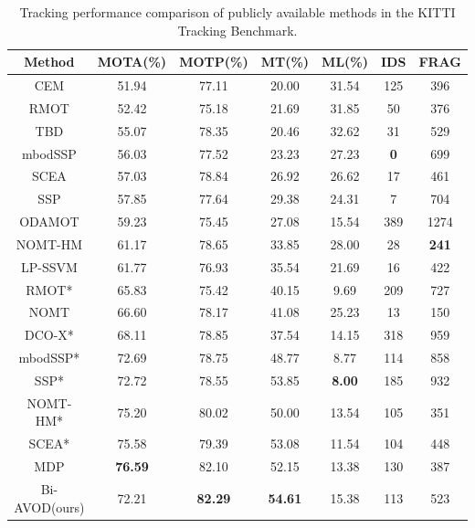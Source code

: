 \documentclass[letterpaper, 10 pt, conference]{ieeeconf}  %
\begin{document}
\begin{table}\centering
	\begin{tabular}{ccccccc}
		\toprule[1.5pt]
		Method        & MOTA(\%) & MOTP(\%) & MT(\%) & ML(\%) & IDS & FRAG \\ \midrule
		CEM\cite{Milan2014PAMI}           & 51.94    & 77.11    & 20.00  & 31.54  & 125 & 396  \\
		RMOT\cite{Yoon2015WACV}          & 52.42    & 75.18    & 21.69  & 31.85  & 50  & 376  \\
		TBD\cite{Geiger2014PAMI}           & 55.07    & 78.35    & 20.46  & 32.62  & 31  & 529  \\
		mbodSSP\cite{Lenz2015ICCV}        & 56.03    & 77.52    & 23.23  & 27.23  & \textbf{0}   & 699  \\
		SCEA\cite{Yoon2016CVPR}          & 57.03    & 78.84    & 26.92  & 26.62  & 17  & 461  \\
		SSP\cite{Lenz2015ICCV}            & 57.85    & 77.64    & 29.38  & 24.31  & 7   & 704  \\
		ODAMOT\cite{Gaidon2015BMVC}        & 59.23    & 75.45    & 27.08  & 15.54  & 389 & 1274 \\
		NOMT-HM\cite{Choi2015ICCV}       & 61.17    & 78.65    & 33.85  & 28.00  & 28  & \textbf{241}  \\
		LP-SSVM\cite{Wang2016IJCV}       & 61.77    & 76.93    & 35.54  & 21.69  & 16  & 422  \\
		RMOT*\cite{Yoon2015WACV}         & 65.83    & 75.42    & 40.15  & 9.69   & 209 & 727  \\
		NOMT\cite{Choi2015ICCV}          & 66.60    & 78.17    & 41.08  & 25.23  & 13  & 150  \\
		DCO-X*\cite{Milan2013CVPR}        & 68.11    & 78.85    & 37.54  & 14.15  & 318 & 959  \\
		mbodSSP*\cite{Lenz2015ICCV}       & 72.69    & 78.75    & 48.77  & 8.77   & 114 & 858  \\
		SSP*\cite{Lenz2015ICCV}           & 72.72    & 78.55    & 53.85  & \textbf{8.00}   & 185 & 932  \\
		NOMT-HM*\cite{Choi2015ICCV}      & 75.20    & 80.02    & 50.00  & 13.54  & 105 & 351  \\
		SCEA*\cite{Yoon2016CVPR}         & 75.58    & 79.39    & 53.08  & 11.54  & 104 & 448  \\
		MDP\cite{xiang2017subcategory}   & \textbf{76.59}    & 82.10    & 52.15  & 13.38  & 130 & 387   \\ \midrule 
		Bi-AVOD(ours) & 72.21    & \textbf{82.29}    & \textbf{54.61}  & 15.38   & 113 & 523  \\ 
		\bottomrule[1.5pt]
	\end{tabular}
	\caption{Tracking performance comparison of publicly available methods in the KITTI Tracking Benchmark.}
	\label{label:result_kitti}
\end{table}
\end{document}
